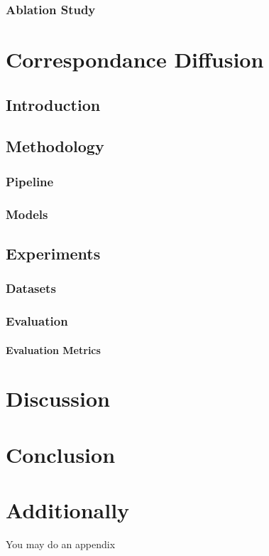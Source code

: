 \documentclass[12pt,DIV14,BCOR12mm,a4paper,footinclude=false,headinclude,parskip=half-,twoside,openright,cleardoublepage=empty,toc=index,bibliography=totoc,listof=totoc]{scrreprt}
\numberwithin{equation}{chapter}
\begin{document}
\subsection{Ablation Study}
\chapter{Correspondance Diffusion}
\section{Introduction}
\section{Methodology}
\subsection{Pipeline}
\subsection{Models}
\section{Experiments}
\subsection{Datasets}
\subsection{Evaluation}
\subsubsection{Evaluation Metrics}
\chapter{Discussion}

\chapter{Conclusion}

\appendix
\chapter{Additionally}
You may do an appendix



\listoffigures
\listoftables
\end{document}
